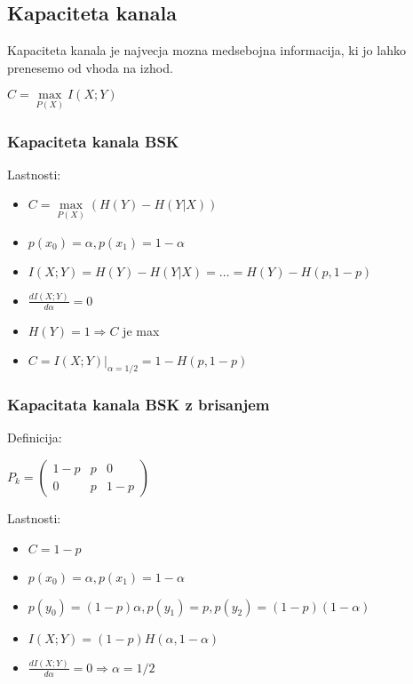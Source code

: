 \documentclass{article}
\begin{document}
\begin{multicols}{4}
\subsection{Kapaciteta kanala}
Kapaciteta kanala je najvecja mozna medsebojna informacija, ki jo lahko prenesemo od vhoda na izhod.
\begin{center}
    $C =\underset{P(X)}{\max} I(X;Y)$
\end{center}
\subsubsection{Kapaciteta kanala BSK}
Lastnosti:
\begin{itemize}
    \item $C =\underset{P(X)}{\max} (H(Y) - H(Y|X))$
    \item $p(x_0) = \alpha, p(x_1) = 1 - \alpha$
    \item $I(X;Y) = H(Y) - H(Y|X) = \dots = H(Y) - H(p, 1-p)$
    \item $\frac{dI(X;Y)}{d \alpha} = 0$
    \item $H(Y) = 1 \Rightarrow C$ je max
    \item $C=I(X;Y) |_{\alpha = 1/2} = 1 - H(p, 1-p)$
\end{itemize}
\subsubsection{Kapacitata kanala BSK z brisanjem}
Definicija:
\begin{center}
    \begin{math}
        P_k = 
                \begin{pmatrix}
                    1-p & p & 0\\
                    0   & p & 1-p
                \end{pmatrix}
    \end{math}
\end{center}
Lastnosti:
\begin{itemize}
    \item $C = 1 - p$
    \item $p(x_0) = \alpha, p(x_1) = 1 - \alpha$
    \item $p(y_0) = (1-p)\alpha, p(y_1) = p, p(y_2) = (1-p)(1-\alpha)$
    \item $I(X;Y) = (1-p)H(\alpha, 1 - \alpha)$
    \item $\frac{dI(X;Y)}{d \alpha} = 0 \Rightarrow \alpha = 1/2$
\end{itemize}


\end{multicols}
\end{document}
